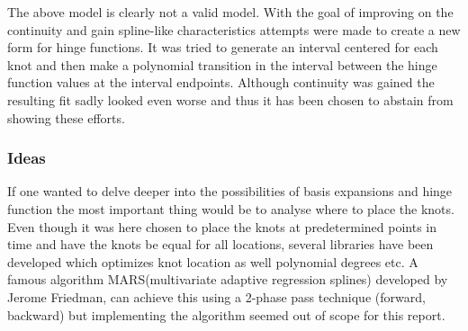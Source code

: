 The above model is clearly not a valid model.
With the goal of improving on the continuity and gain spline-like characteristics attempts were made to create a new form for hinge functions.
 It was tried to generate an interval centered for each knot and then make a polynomial transition in the interval between the hinge function values at the interval endpoints.
 Although continuity was gained the resulting fit sadly looked even worse and thus it has been chosen to abstain from showing these efforts.
 \\
\subsubsection{Ideas}
If one wanted to delve deeper into the possibilities of basis expansions and hinge function the most important thing would be to analyse where to place the knots. Even though it was here chosen to place the knots at predetermined points in time and have the knots be equal for all locations, several libraries have been developed which optimizes knot location as well polynomial degrees etc.
 A famous algorithm MARS\textregistered (multivariate adaptive regression splines) developed by Jerome Friedman, can achieve this using a 2-phase pass technique \cite{wiki-MARS} (forward, backward) but implementing the algorithm seemed out of scope for this report.